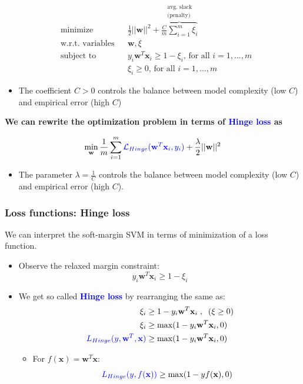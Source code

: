 \documentclass[12pt, a4paper]{article}
\begin{document}
\begin{equation*}
\begin{aligned}
& \text{minimize}
& & \frac{1}{2} ||\mathbf{w}||^2 + \overbrace{\frac{C}{m} \sum_{i=1}^m \xi_i}^{\substack{\text{avg. slack} \\ \text{(penalty)}}} \\
& \text{w.r.t. variables}
& & \mathbf{w}, \xi \\
& \text{subject to}
& & y_i \mathbf{w}^T \mathbf{x}_i \geq 1 - \xi_i \text{, for all } i = 1, ..., m \\
&&& \xi_i \geq 0 \text{, for all } i = 1, ..., m
\end{aligned}
\end{equation*}
\begin{itemize}
  \item The coefficient $C > 0$ controls the balance between model complexity (low $C$) and empirical error (high $C$)
\end{itemize}


\textbf{We can rewrite the optimization problem in terms of \textcolor{blue}{Hinge loss} as}

$$
\min_\mathbf{w} \frac{1}{m} \sum_{i=1}^m \textcolor{blue}{\mathcal{L}_{Hinge}(\mathbf{w}^T \mathbf{x}_i, y_i)} + \frac{\lambda}{2} ||\mathbf{w}||^2
$$

\begin{itemize}
  \item The parameter $\lambda = \frac{1}{C}$ controls the balance between model complexity (low $C$) and empirical error (high $C$).
\end{itemize}






\subsubsection{Loss functions: Hinge loss}\label{hinge-loss}


We can interpret the soft-margin SVM in terms of minimization of a loss function.

\begin{itemize}
  \item Observe the relaxed margin constraint:
  $$
  y_i \mathbf{w}^T \mathbf{x}_i \geq 1 - \xi_i
  $$
  \item We get so called \textbf{\textcolor{blue}{Hinge loss}} by rearranging the same as:
  \begin{align*}
    \xi_i &\geq 1 - y_i \mathbf{w}^T \mathbf{x}_i \;,\;\; (\xi \geq 0) \\
    \xi_i &\geq \max(1 - y_i \mathbf{w}^T \mathbf{x}_i, 0) \\
    \textcolor{blue}{L_{Hinge}(y, \mathbf{w}^T, \mathbf{x})} &\geq \max(1 - y_i \mathbf{w}^T \mathbf{x}_i, 0)
  \end{align*}
  \begin{itemize}
    \item For $f(\mathbf{x}) = \mathbf{w}^T \mathbf{x}$:
    $$
    \textcolor{blue}{L_{Hinge}(y, f(\mathbf{x}))} \geq \max(1 - y f(\mathbf{x}), 0)
    $$
  \end{itemize}
\end{itemize}
\end{document}

